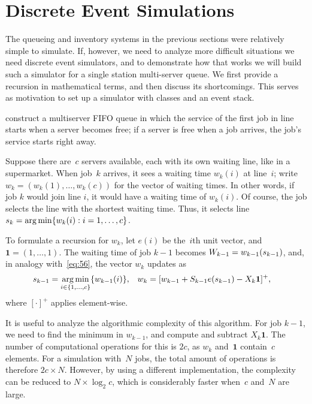 \documentclass[stochastic-or.tex]{subfiles}
\begin{document}
\section{Discrete Event Simulations}
\label{sec:discr-event-simul}



The queueing and inventory systems in the previous sections were relatively simple to simulate.
If, however, we need to analyze more difficult situations we need discrete event simulators, and to demonstrate how that works we will build such a simulator for a single station multi-server queue.
We first provide a recursion in mathematical terms, and then discuss its shortcomings.
This serves as motivation to set up a simulator with classes and an event stack.



 construct a multiserver FIFO queue in which the service of the first job in line starts when a server becomes free; if a server is free when a job arrives, the job's service  starts right away.

Suppose there are~$c$ servers available, each with its own waiting line, like in a supermarket.
When job~$k$ arrives, it sees a waiting time $w_{k}(i)$ at line~$i$; write $w_k = (w_{k}(1), \ldots, w_{k}(c))$ for the vector of waiting times. In other words, if job $k$ would join line $i$, it would have a waiting time of $w_{k}(i)$.
Of course, the job selects the line with the shortest waiting time.
Thus, it selects line $s_k = \operatorname*{arg\,min}\{w_{k}(i) : i=1,\ldots, c\}$.

To formulate a recursion for $w_{k}$, let $e(i)$ be the~$i$th unit vector, and $\mathbf{1} = (1,\ldots, 1)$.
The waiting time of job $k-1$ becomes $W_{k-1} = w_{k-1}(s_{k-1})$, and, in analogy with~\cref{eq:56}, the vector $w_k$ updates as
\begin{align*}
  s_{k-1} &= \operatorname*{arg\,min}_{i \in \{1, \ldots, c\}}\{w_{k-1}(i)\},&
  w_{k} &= [w_{k-1} + S_{k-1} e(s_{k-1}) - X_{k}\mathbf{1}]^+,
\end{align*}
where $[\cdot]^+$ applies element-wise.


It is useful to analyze the algorithmic complexity of this algorithm.
For job $k-1$, we need to find the minimum in $w_{k-1}$, and compute and subtract $X_{k}\mathbf{1}$.
The number of computational operations for this is $2c$, as $w_k$ and~$\mathbf{1}$ contain~$c$ elements.
For a simulation with~$N$ jobs, the total amount of operations is therefore $2c \times N$.
However, by using a different implementation, the complexity can be reduced to $N\times \log_2{c}$, which is considerably faster when~$c$ and~$N$ are large.
\end{document}

